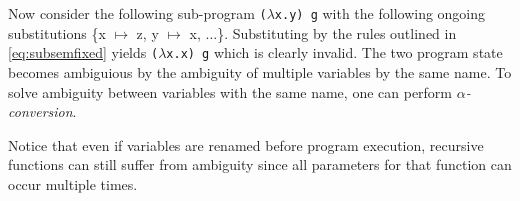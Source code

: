 \documentclass[11pt,oneside,a4paper]{report}
\begin{document}
\begin{exmp}
\begin{figure}[ht]
\begin{mdframed}
\begin{subfigure}[b]{1\textwidth}
        \caption{}
        \label{fig:rules:exmp:right}
      \end{subfigure}
        \vspace*{0.49cm}
      \begin{subfigure}[b]{1\textwidth}
        \begin{prooftree}
        \end{prooftree}
      \end{subfigure}
    \end{mdframed}
    \caption{}
    \label{fig:rules:exmp:sol}
  \end{figure}
\end{exmp}
Now consider the following sub-program \texttt{($\lambda$x.y) g} with the following ongoing substitutions \{x $\mapsto$ z, y $\mapsto$ x, $\dots$\}.
Substituting by the rules outlined in \autoref{eq:subsemfixed} yields \texttt{($\lambda$x.x) g} which is clearly invalid.
The two program state becomes ambiguious by the ambiguity of multiple variables by the same name.
To solve ambiguity between variables with the same name, one can perform \textit{$\alpha$-conversion}.
\begin{remark}
  Notice that even if variables are renamed before program execution, recursive functions can still suffer from ambiguity since all parameters for that function can occur multiple times.
\end{remark}
\end{document}
